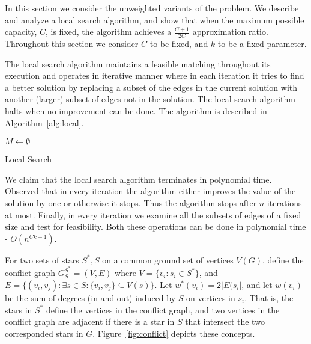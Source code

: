 In this section we consider the unweighted variants of the problem.
We describe and analyze a local search algorithm, 
and show that when the maximum possible capacity, $C$, is fixed, the algorithm achieves 
a $\frac{C + 1}{2C}$ approximation ratio.
Throughout this section we consider $C$ to be fixed, and $k$ to be a fixed parameter.  

The local search algorithm maintains a feasible matching throughout its execution
and operates in 
iterative manner where in each iteration it tries to find a better solution by
replacing a subset of the edges in the current solution with 
another (larger) subset of edges not in the solution.
The local search algorithm halts when no improvement can be done.
The algorithm is described in Algorithm~\ref{alg:local}. 

\begin{algorithm}
$M \leftarrow \emptyset$								\\

\caption{
\label{alg:local}
Local Search}
\end{algorithm}


We claim that the local search algorithm terminates in polynomial time.
Observed that in every iteration the algorithm either improves the value of the solution
by one or otherwise it stops. 
Thus the algorithm stops after $n$ iterations at most.
Finally, 
in every iteration we examine all the subsets of edges of a fixed size 
and test for feasibility.
Both these operations can be done in polynomial time - $O(n^{Ck + 1})$. 


For two sets of stars $S^*, S$ on a common ground set of vertices $V(G)$,
define the conflict graph $G^{S^*}_{S} = (V, E)$
where $V = \{v_i : s_i \in S^*\}$, 
and $E = \{(v_i, v_j) : 
\exists s \in S : 
\{v_i, v_j\} \subseteq V(s) 
\}$.
Let $w^*(v_i) = 2|E(s_i|$, 
and let $w(v_i)$ be the sum of degrees (in and out) induced by $S$ on vertices in $s_i$. 
That is, the stars in $S^*$ define the vertices in the conflict graph,
and two vertices in the conflict graph are adjacent if there is a star in 
$S$ that intersect the two corresponded stars in $G$.
Figure~\ref{fig:conflict} depicts these concepts.

